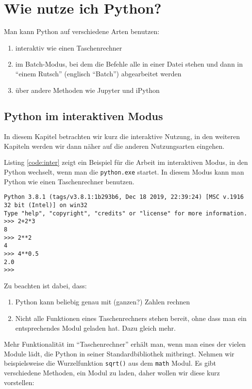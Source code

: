 \documentclass[12pt,ngerman]{scrreprt}
\begin{document}
\chapter{Wie nutze ich Python?}

Man kann Python auf verschiedene Arten benutzen:

\begin{enumerate}
\item interaktiv wie einen Taschenrechner
\item im Batch-Modus, bei dem die Befehle alle in einer Datei stehen und dann in \enquote{einem Rutsch} (englisch \enquote{Batch}) abgearbeitet werden
\item über andere Methoden wie Jupyter und iPython
\end{enumerate}

\section{Python im interaktiven Modus}


In diesem Kapitel betrachten wir kurz die interaktive Nutzung, in den weiteren Kapiteln werden wir dann näher auf die anderen Nutzungsarten eingehen. 

Listing \ref{code:inter} zeigt ein Beispiel für die Arbeit im interaktiven Modus, in den Python wechselt, wenn man die \texttt{python.exe} startet. In diesem Modus kann man Python wie einen Taschenrechner benutzen.

\begin{lstlisting}[caption={Im interaktiven Modus},label={code:inter}]
Python 3.8.1 (tags/v3.8.1:1b293b6, Dec 18 2019, 22:39:24) [MSC v.1916 32 bit (Intel)] on win32
Type "help", "copyright", "credits" or "license" for more information.
>>> 2+2*3
8
>>> 2**2
4
>>> 4**0.5
2.0
>>>
\end{lstlisting}

Zu beachten ist dabei, dass:

\begin{enumerate}
\item Python kann beliebig genau mit (ganzen?) Zahlen rechnen
\item Nicht alle Funktionen eines Taschenrechners stehen bereit, ohne dass man ein entsprechendes Modul geladen hat. Dazu gleich mehr.
\end{enumerate}

Mehr Funktionalität im \enquote{Taschenrechner} erhält man, wenn man eines der vielen Module lädt, die Python in seiner Standardbibliothek mitbringt. Nehmen wir beispielsweise die Wurzelfunktion \texttt{sqrt()} aus dem \texttt{math} Modul. Es gibt verschiedene Methoden, ein Modul zu laden, daher wollen wir diese kurz vorstellen:
\end{document}
